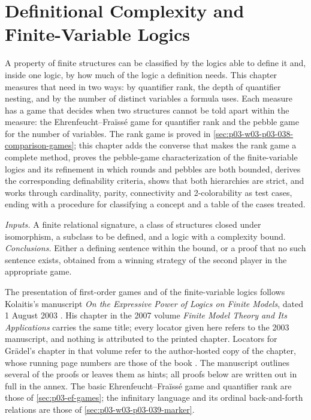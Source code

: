 \chapter{Definitional Complexity and Finite-Variable Logics}
\label{sec:p03-w03-p03-055-definitional-complexity}

A property of finite structures can be classified by the logics able to
define it and, inside one logic, by how much of the logic a definition
needs. This chapter measures that need in two ways: by quantifier rank, the
depth of quantifier nesting, and by the number of distinct variables a
formula uses. Each measure has a game that decides when two structures cannot
be told apart within the measure: the Ehrenfeucht--Fra\"iss\'e game for
quantifier rank and the pebble game for the number of variables. The
rank game is proved in \cref{sec:p03-w03-p03-038-comparison-games}; this
chapter adds the converse that makes the rank game a complete method,
proves the pebble-game characterization of the finite-variable logics
and its refinement in which rounds and pebbles are both bounded,
derives the corresponding definability criteria, shows that both
hierarchies are strict, and works through cardinality, parity,
connectivity and 2-colorability as test cases, ending with a procedure
for classifying a concept and a table of the cases treated.

\emph{Inputs.} A finite relational signature, a class of structures closed
under isomorphism, a subclass to be defined, and a logic with a complexity
bound. \emph{Conclusions.} Either a defining sentence within the bound, or a
proof that no such sentence exists, obtained from a winning strategy of the
second player in the appropriate game.

The presentation of first-order games and of the finite-variable logics
follows Kolaitis's manuscript \emph{On the Expressive Power of Logics on
Finite Models}, dated 1 August 2003 \cite{Kolaitis2003ExpressivePowerNotes}.
His chapter in the 2007 volume \emph{Finite Model Theory and Its
Applications} carries the same title; every locator given here refers to
the 2003 manuscript, and nothing is attributed to the printed chapter.
Locators for Gr\"adel's chapter in that volume refer to the author-hosted
copy of the chapter, whose running page numbers are those of the book
\cite{Gradel2007FMTDescriptiveChapter}. The manuscript outlines several of the
proofs or leaves them as hints; all proofs below are written out in full in
the annex. The basic Ehrenfeucht--Fra\"iss\'e game and quantifier rank are
those of \cref{sec:p03-ef-games}; the infinitary language and its ordinal
back-and-forth relations are those of \cref{sec:p03-w03-p03-039-marker}.

